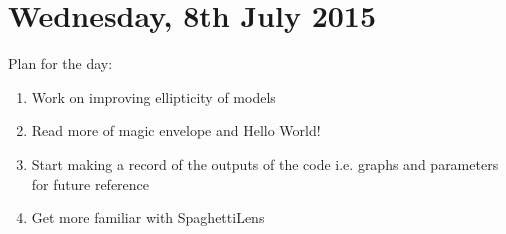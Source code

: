 \documentclass{article}
\begin{document}
\section{Wednesday, 8th July 2015}
\noindent Plan for the day:
\begin{enumerate}
  \item Work on improving ellipticity of models
  \item Read more of magic envelope and Hello World!
  \item Start making a record of the outputs of the code i.e. graphs and parameters for future reference
  \item Get more familiar with SpaghettiLens
\end {enumerate}
\end{document}
